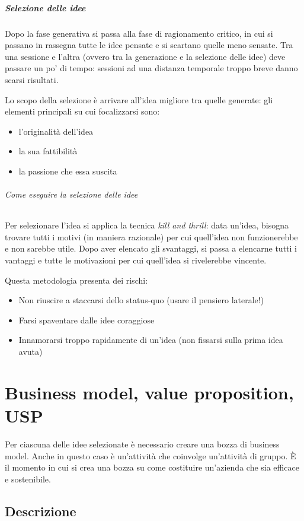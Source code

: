 \paragraph*{Selezione delle idee} Dopo la fase generativa si passa alla fase di
ragionamento critico, in cui si passano in rassegna tutte le idee pensate e si
scartano quelle meno sensate. Tra una sessione e l'altra (ovvero tra la
generazione e la selezione delle idee) deve passare un po' di tempo: sessioni
ad una distanza temporale troppo breve danno scarsi risultati.

Lo scopo della selezione è arrivare all'idea migliore tra quelle generate: gli
elementi principali su cui focalizzarsi sono:
\begin{itemize}
 \item l'originalità dell'idea
 \item la sua fattibilità
 \item la passione che essa suscita
\end{itemize}

\subparagraph*{Come eseguire la selezione delle idee} Per selezionare l'idea si
applica la tecnica \textit{kill and thrill}: data un'idea, bisogna trovare
tutti i motivi (in maniera razionale) per cui quell'idea non funzionerebbe e
non sarebbe utile. Dopo aver elencato gli svantaggi, si passa a elencarne tutti
i vantaggi e tutte le motivazioni per cui quell'idea si rivelerebbe vincente.

Questa metodologia presenta dei rischi:
\begin{itemize}
 \item Non riuscire a staccarsi dello status-quo (usare il pensiero laterale!)
 \item Farsi spaventare dalle idee coraggiose
 \item Innamorarsi troppo rapidamente di un'idea (non fissarsi sulla prima idea
avuta)
\end{itemize}

\chapter{Business model, value proposition, USP}

Per ciascuna delle idee selezionate è necessario creare una bozza di business
model. Anche in questo caso è un'attività che coinvolge un'attività di gruppo. È
il momento in cui si crea una bozza su come costituire un'azienda che sia
efficace e sostenibile.

\section{Descrizione}

